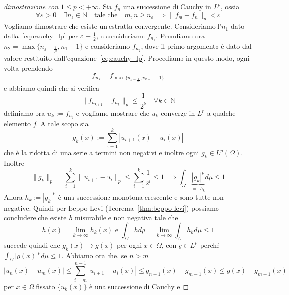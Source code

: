 \begin{proof}[dimostrazione con \(1 \le p < +\infty\)]
    Sia \(f_{n}\) una successione di Cauchy in \(L^{p}\), ossia
    \begin{equation}\label{eq:cauchy_lp}
        \forall \varepsilon > 0 \quad \exists n_\varepsilon \in \mathbb{N} \quad
        \text{tale che} \quad m, n \ge n_\varepsilon \implies \|f_{m} -
        f_{n}\|_{p} < \varepsilon
    \end{equation}
    Vogliamo dimostrare che esiste un'estratta convergente. Consideriamo
    l'\(n_{1} \) dato dalla~\eqref{eq:cauchy_lp} per \(\varepsilon = \frac{1}{2}\), e
    consideriamo \(f_{n_{1} } \). Prendiamo ora \(n_{2} =
    \max\{n_{\varepsilon = \frac{1}{2^2}}, n_{1}+1\}\) e consideriamo \(f_{n_{2}}\), dove il primo argomento è dato dal valore restituito
    dall'equazione~\ref{eq:cauchy_lp}. Procediamo in questo modo, ogni volta
    prendendo
    \[
    f_{n_k} = f_{\max\{n_{\varepsilon = \frac{1}{2^k}}, n_{k-1} + 1\}}
    \]
    e abbiamo quindi che si verifica
    \[
        \|f_{n_{k+1}} - f_{n_k} \|_p \le \frac{1}{2^{k}} \quad \forall k \in \mathbb{N}
    \]
    definiamo ora \(u_k := f_{n_k} \) e vogliamo mostrare che \(u_k\) converge
    in \(L^{p}\) a qualche elemento \(f\). A tale scopo sia
    \[
        g_k(x) := \sum_{i=1}^{k} \left| u_{i+1} {(x)} - u_{i}{(x)} \right|  
    \]
    che è la ridotta di una serie a termini non negativi e inoltre ogni \(g_k
    \in L^{p}(\Omega)\). Inoltre
    \[
        \|g_k\|_p = \sum_{i=1}^{k} \|u_{i+1} -u_{i}\|_p \le \sum_{i=1}^{k}
        \frac{1}{2^{i}} \le 1 \implies \int_{\Omega} \underbrace{\left| g_k
        \right|^{p}}_{=:h_k} d\mu
        \le 1
    \]
    Allora \(h_k := |g_k|^{p}\) è una successione monotona crescente e sono
    tutte non negative. Quindi per Beppo Levi (Teorema~\ref{thm:beppo-levi})
possiamo concludere che esiste \(h\) misurabile e non negativa tale
che 
\[
    h(x) = \lim_{k\to \infty} h_k(x) \text{ e } \int_{\Omega} h d\mu =
    \lim_{k\to \infty} \int_{\Omega} h_k d\mu \le 1
\]
succede quindi che \(g_k(x) \to g(x)\) per ogni \(x \in \Omega\), con \(g \in
L^{p}\) perché \(\int_{\Omega} |g(x)|^{p} d\mu \le 1 \).
Abbiamo ora che, se \(n > m\) 
\begin{equation}\label{eq:cauchy_lp_pf1}
    \left| u_n(x) - u_{m}{(x)} \right| \le \sum_{i=m}^{n-1} \left| u_{i+1}
    -u_{i}{(x)} \right| \le g_{n-1} {(x)} - g_{m-1}{(x)} \le g(x) - g_{m-1} {(x)}
\end{equation}
per \(x \in \Omega\) fissato \(\{u_{k} {(x)}\} \) è una successione di Cauchy e

\end{proof}
